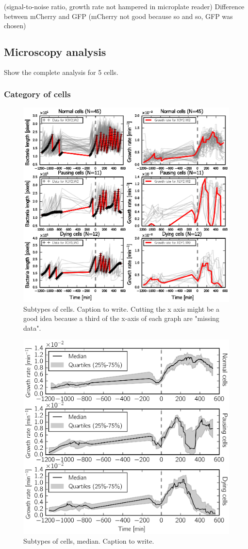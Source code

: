 (signal-to-noise ratio, growth rate not hampered in microplate reader)
Difference between mCherry and GFP (mCherry not good because so and so, GFP was chosen)

\subsection{Microscopy analysis}

Show the complete analysis for 5 cells.

\subsubsection*{Category of cells}

\begin{figure}[p]
\centering
\includegraphics[scale=1]{./Fig/subcat_cells}
\caption{Subtypes of cells. Caption to write. Cutting the x axis might be a good idea because a third of the x-axis of each graph are "missing data".}
\label{fig:subcat_cells}
\end{figure}

\begin{figure}[p]
\centering
\includegraphics[scale=1]{./Fig/subcat_median}
\caption{Subtypes of cells, median. Caption to write.}
\label{fig:subcat_median}
\end{figure}